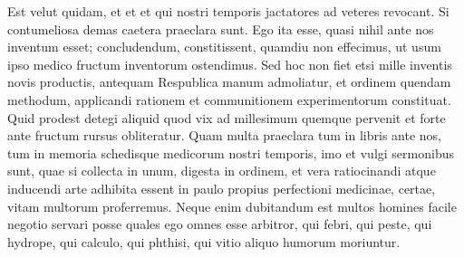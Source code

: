 %
Est velut
%
quidam, et
%
et 
et 
%
qui nostri temporis jactatores ad veteres revocant.
Si contumeliosa demas caetera praeclara sunt.
Ego ita 
esse, quasi nihil ante nos inventum esset; concludendum,
constitissent, quamdiu non effecimus, ut usum ipso medico fructum inventorum ostendimus.
Sed hoc non fiet etsi mille inventis novis productis, antequam Respublica manum admoliatur,
et ordinem quendam methodum, applicandi rationem et communitionem experimentorum constituat.
Quid prodest detegi aliquid quod vix ad millesimum quemque pervenit et forte ante fructum rursus obliteratur.
Quam multa praeclara tum in libris ante nos, tum in memoria schedisque medicorum nostri temporis, imo et vulgi sermonibus sunt, quae si collecta in unum, digesta in ordinem, et vera ratiocinandi atque inducendi arte adhibita essent in
paulo propius perfectioni medicinae, certae, vitam multorum proferremus.
Neque enim dubitandum est multos homines facile negotio servari posse quales ego omnes esse arbitror, qui febri, qui peste, qui hydrope, qui calculo, qui phthisi, qui vitio aliquo humorum moriuntur.
